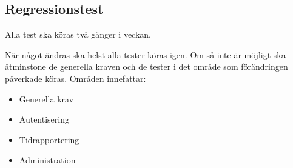 \documentclass[a4paper]{article}
\begin{document}
\subsection{Regressionstest}

Alla test ska köras två gånger i veckan.

När något ändras ska helst alla tester köras igen. Om så inte är möjligt ska åtminstone de
generella kraven och de tester i det område som förändringen påverkade köras.
Områden innefattar:

\begin{itemize}

\item
Generella krav

\item
Autentisering

\item
Tidrapportering

\item
Administration

\end{itemize}
\end{document}
